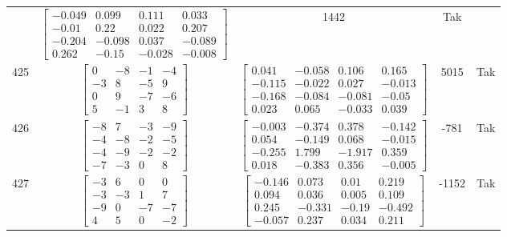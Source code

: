 \documentclass[a4paper,12pt]{article}
\begin{document}
\begin{tabular}{c c c c c}
&
$\begin{bmatrix} -0.049 & 0.099 & 0.111 & 0.033 \\ -0.01 & 0.22 & 0.022 & 0.207 \\ -0.204 & -0.098 & 0.037 & -0.089 \\ 0.262 & -0.15 & -0.028 & -0.008 \end{bmatrix}$
&
1442
&
Tak
\\
425
&
$\begin{bmatrix} 0 & -8 & -1 & -4 \\ -3 & 8 & -5 & 9 \\ 0 & 9 & -7 & -6 \\ 5 & -1 & 3 & 8 \end{bmatrix}$
&
$\begin{bmatrix} 0.041 & -0.058 & 0.106 & 0.165 \\ -0.115 & -0.022 & 0.027 & -0.013 \\ -0.168 & -0.084 & -0.081 & -0.05 \\ 0.023 & 0.065 & -0.033 & 0.039 \end{bmatrix}$
&
5015
&
Tak
\\
426
&
$\begin{bmatrix} -8 & 7 & -3 & -9 \\ -4 & -8 & -2 & -5 \\ -4 & -9 & -2 & -2 \\ -7 & -3 & 0 & 8 \end{bmatrix}$
&
$\begin{bmatrix} -0.003 & -0.374 & 0.378 & -0.142 \\ 0.054 & -0.149 & 0.068 & -0.015 \\ -0.255 & 1.799 & -1.917 & 0.359 \\ 0.018 & -0.383 & 0.356 & -0.005 \end{bmatrix}$
&
-781
&
Tak
\\
427
&
$\begin{bmatrix} -3 & 6 & 0 & 0 \\ -3 & -3 & 1 & 7 \\ -9 & 0 & -7 & -7 \\ 4 & 5 & 0 & -2 \end{bmatrix}$
&
$\begin{bmatrix} -0.146 & 0.073 & 0.01 & 0.219 \\ 0.094 & 0.036 & 0.005 & 0.109 \\ 0.245 & -0.331 & -0.19 & -0.492 \\ -0.057 & 0.237 & 0.034 & 0.211 \end{bmatrix}$
&
-1152
&
Tak
\\

\end{tabular}
\end{document}
